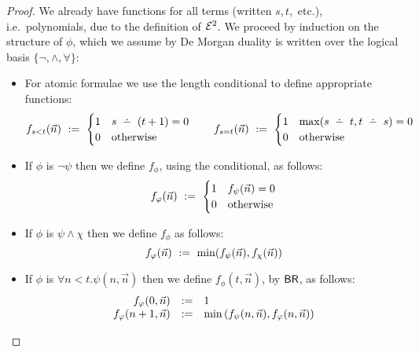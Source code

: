 \documentclass{lmcs}
\begin{document}
\begin{proof}
	We already have functions for all terms (written $s,t,$ etc.), i.e.\ polynomials, due to the definition of $\mathcal{E}^2$.
	We proceed by induction on the structure of $\phi$, which we assume by De Morgan duality is written over the logical basis $\{ \neg, \wedge, \forall \}$: 
	\begin{itemize}
		\item For atomic formulae we use the length conditional to define appropriate functions:
		\[
		f_{s<t} (\vec n )
		\ \dfn \ 
		\begin{cases}
		1 & s \subtr (t+1) = 0 \\
		0 & \text{otherwise}
		\end{cases}
\qquad
		f_{s=t} (\vec n)
		\ \dfn \ 
		\begin{cases}
		1 & 		{\max (s \subtr t , t \subtr s) } = 0 \\
		0 & \text{otherwise}
		\end{cases}
		\]
		\item If $\phi $ is $\neg \psi$ then we define $f_\phi$, using the conditional, as follows:
		\[
		f_\phi ( \vec n)
		\ \dfn \ 
		\begin{cases}
		1 & f_\psi(\vec n) = 0 \\
		0 & \text{otherwise}
		\end{cases}
		\]
		\item If $\phi$ is $\psi \wedge \chi$ then we define $f_\phi$ as follows: 
		$$f_\phi ( \vec n)\ \dfn \ 
		\min (f_\psi (\vec n) , f_\chi ( \vec n))
		$$
		\item If $\phi $ is $\forall n < t . \psi (n,\vec n)$ then we define $f_\phi (t , \vec n)$, by $\mathsf{BR}$, as follows:
		\[
		\begin{array}{rcl}
		f_\varphi (0, \vec n ) & := & 1 \\
		f_\varphi ( n + 1 , \vec n) & := & \min \left(f_\psi (n, \vec n) ,  f_\varphi(n, \vec n) \right)
		\end{array}
				\qedhere
		\] 

	\end{itemize}
\end{proof}
\end{document}
